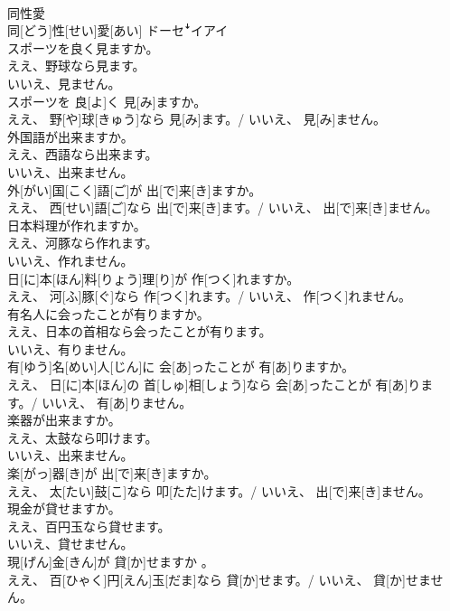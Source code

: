 \documentclass[8pt]{extreport}
\begin{document}
\begin{CJK}{UTF8}{min}
\\	同性愛	
\\	同[どう]性[せい]愛[あい]	ドーセꜜイアイ
\\	スポーツを良く見ますか。 
\\	ええ、野球なら見ます。 
\\	いいえ、見ません。	
\\	スポーツを 良[よ]く 見[み]ますか。 
\\	ええ、 野[や]球[きゅう]なら 見[み]ます。/ いいえ、 見[み]ません。
\\	外国語が出来ますか。 
\\	ええ、西語なら出来ます。 
\\	いいえ、出来ません。	
\\	外[がい]国[こく]語[ご]が 出[で]来[き]ますか。 
\\	ええ、 西[せい]語[ご]なら 出[で]来[き]ます。/ いいえ、 出[で]来[き]ません。
\\	日本料理が作れますか。 
\\	ええ、河豚なら作れます。 
\\	いいえ、作れません。	
\\	日[に]本[ほん]料[りょう]理[り]が 作[つく]れますか。 
\\	ええ、 河[ふ]豚[ぐ]なら 作[つく]れます。/ いいえ、 作[つく]れません。
\\	有名人に会ったことが有りますか。 
\\	ええ、日本の首相なら会ったことが有ります。 
\\	いいえ、有りません。	
\\	有[ゆう]名[めい]人[じん]に 会[あ]ったことが 有[あ]りますか。 
\\	ええ、 日[に]本[ほん]の 首[しゅ]相[しょう]なら 会[あ]ったことが 有[あ]ります。/ いいえ、 有[あ]りません。
\\	楽器が出来ますか。 
\\	ええ、太鼓なら叩けます。 
\\	いいえ、出来ません。	
\\	楽[がっ]器[き]が 出[で]来[き]ますか。 
\\	ええ、 太[たい]鼓[こ]なら 叩[たた]けます。/ いいえ、 出[で]来[き]ません。
\\	現金が貸せますか。 
\\	ええ、百円玉なら貸せます。 
\\	いいえ、貸せません。	
\\	現[げん]金[きん]が 貸[か]せますか 。 
\\	ええ、 百[ひゃく]円[えん]玉[だま]なら 貸[か]せます。/ いいえ、 貸[か]せません。

\end{CJK}
\end{document}
